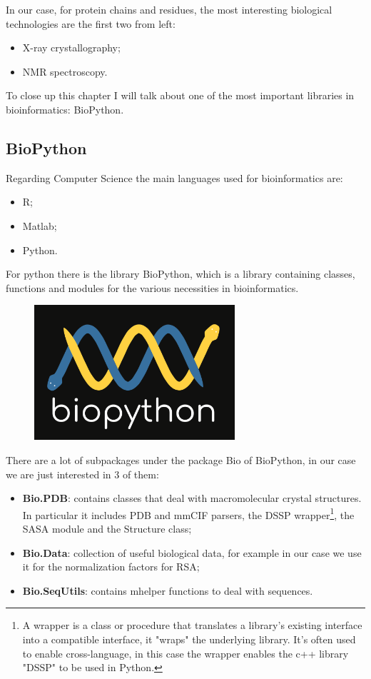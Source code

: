In our case, for protein chains and residues, the most interesting biological technologies are the first two from left:
\begin{itemize}
    \item X-ray crystallography;
    \item NMR spectroscopy.
\end{itemize}

To close up this chapter I will talk about one of the most important libraries in bioinformatics: BioPython.
\subsection{BioPython}
Regarding Computer Science the main languages used for bioinformatics are:
\begin{itemize}
    \item R;
    \item Matlab;
    \item Python.
\end{itemize}
For python there is the library BioPython, which is a library containing classes, functions and modules for the various necessities in bioinformatics.

\begin{figure}[h!]
    \centering
    \includegraphics{res/proteins_overview/biopython.png}
\end{figure}

There are a lot of subpackages under the package Bio of BioPython, in our case we are just interested in 3 of them:
\begin{itemize}
    \item \textbf{Bio.PDB}: contains classes that deal with macromolecular crystal structures. In particular it includes PDB and mmCIF parsers, the DSSP wrapper\footnote{A wrapper is a class or procedure that translates a library's existing interface into a compatible interface, it "wraps" the underlying library. It's often used to enable cross-language, in this case the wrapper enables the c++ library "DSSP" to be used in Python.}, the SASA module and the Structure class;
    \item \textbf{Bio.Data}: collection of useful biological data, for example in our case we use it for the normalization factors for RSA;
    \item \textbf{Bio.SeqUtils}: contains mhelper functions to deal with sequences.
\end{itemize}

